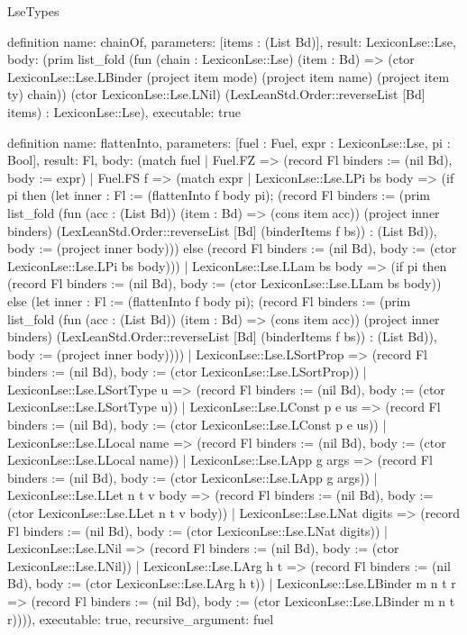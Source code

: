 \begin{lexlean}{LseTypes}
\begin{semanticmodule}
definition{
  name: chainOf,
  parameters: [items : (List Bd)],
  result: LexiconLse::Lse,
  body: (prim list_fold (fun (chain : LexiconLse::Lse) (item : Bd) => (ctor LexiconLse::Lse.LBinder (project item mode) (project item name) (project item ty) chain)) (ctor LexiconLse::Lse.LNil) (LexLeanStd.Order::reverseList [Bd] items) : LexiconLse::Lse),
  executable: true
}

definition{
  name: flattenInto,
  parameters: [fuel : Fuel, expr : LexiconLse::Lse, pi : Bool],
  result: Fl,
  body: (match fuel
    | Fuel.FZ => (record Fl {binders := (nil Bd), body := expr})
    | Fuel.FS f => (match expr
      | LexiconLse::Lse.LPi bs body => (if pi then (let inner : Fl := (flattenInto f body pi); (record Fl {binders := (prim list_fold (fun (acc : (List Bd)) (item : Bd) => (cons item acc)) (project inner binders) (LexLeanStd.Order::reverseList [Bd] (binderItems f bs)) : (List Bd)), body := (project inner body)})) else (record Fl {binders := (nil Bd), body := (ctor LexiconLse::Lse.LPi bs body)}))
      | LexiconLse::Lse.LLam bs body => (if pi then (record Fl {binders := (nil Bd), body := (ctor LexiconLse::Lse.LLam bs body)}) else (let inner : Fl := (flattenInto f body pi); (record Fl {binders := (prim list_fold (fun (acc : (List Bd)) (item : Bd) => (cons item acc)) (project inner binders) (LexLeanStd.Order::reverseList [Bd] (binderItems f bs)) : (List Bd)), body := (project inner body)})))
      | LexiconLse::Lse.LSortProp => (record Fl {binders := (nil Bd), body := (ctor LexiconLse::Lse.LSortProp)})
      | LexiconLse::Lse.LSortType u => (record Fl {binders := (nil Bd), body := (ctor LexiconLse::Lse.LSortType u)})
      | LexiconLse::Lse.LConst p e us => (record Fl {binders := (nil Bd), body := (ctor LexiconLse::Lse.LConst p e us)})
      | LexiconLse::Lse.LLocal name => (record Fl {binders := (nil Bd), body := (ctor LexiconLse::Lse.LLocal name)})
      | LexiconLse::Lse.LApp g args => (record Fl {binders := (nil Bd), body := (ctor LexiconLse::Lse.LApp g args)})
      | LexiconLse::Lse.LLet n t v body => (record Fl {binders := (nil Bd), body := (ctor LexiconLse::Lse.LLet n t v body)})
      | LexiconLse::Lse.LNat digits => (record Fl {binders := (nil Bd), body := (ctor LexiconLse::Lse.LNat digits)})
      | LexiconLse::Lse.LNil => (record Fl {binders := (nil Bd), body := (ctor LexiconLse::Lse.LNil)})
      | LexiconLse::Lse.LArg h t => (record Fl {binders := (nil Bd), body := (ctor LexiconLse::Lse.LArg h t)})
      | LexiconLse::Lse.LBinder m n t r => (record Fl {binders := (nil Bd), body := (ctor LexiconLse::Lse.LBinder m n t r)}))),
  executable: true,
  recursive_argument: fuel
}


\end{semanticmodule}
\end{lexlean}
